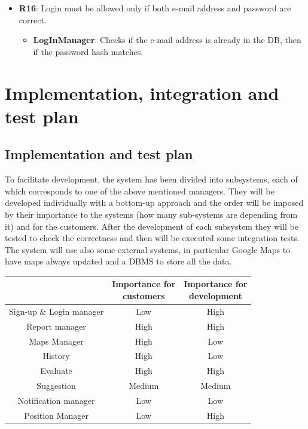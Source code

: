 \documentclass[12pt,a4paper]{report}
\begin{document}
\begin{itemize}
	\item\textbf{R16}: Login must be allowed only if both e-mail address and password are correct.
		\begin{itemize}
		\item\textbf{LogInManager}: Checks if the e-mail address is already in the DB, then if the password hash matches.
		\end{itemize}
	\end{itemize}

	\chapter{Implementation, integration and test plan}
		\section{Implementation and test plan}
			To facilitate development, the system has been divided into subsystems, each of which corresponds to one of the
			above mentioned managers. They will be developed individually with a bottom-up approach and the order will be
			imposed by their importance to the systems (how many sub-systems are depending from it) and for the customers.
			After the development of each subsystem they will be tested to check the correctness and then will be executed
			some integration tests. The system will use also some external systems, in particular Google Maps to have maps
			always updated and a DBMS to store all the data.
			\begin{table}[H]
				\centering
				\begin{tabular}[width = \textwidth, position = center]{|c|c|c|}
					\hline
					\thead{Subsystem} & \thead{Importance for\\ customers} & \thead{Importance for\\ development}\\
					\hline
					\hline
					Sign-up \& Login manager & Low & High\\
					\hline
					Report manager & High & High\\
					\hline
					Maps Manager & High & Low\\
					\hline
					History & High & Low\\
					\hline
					Evaluate & High & High\\
					\hline
					Suggestion & Medium & Medium\\
					\hline
					Notification manager & Low & Low\\
					\hline
					Position Manager & Low & High\\
					\hline
				\end{tabular}
				\label{tab: }
			\end{table}
\end{document}
